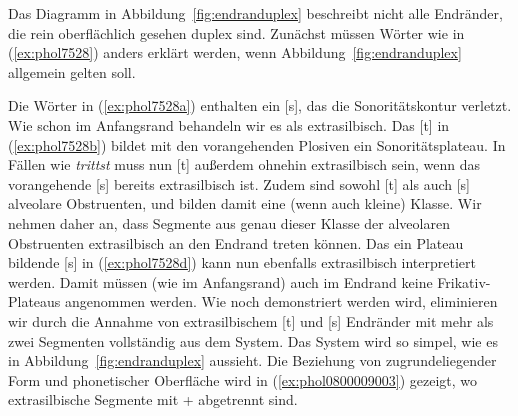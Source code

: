 Das Diagramm in Abbildung~\ref{fig:endranduplex} beschreibt nicht alle Endränder, die rein oberflächlich gesehen duplex sind.
Zunächst müssen Wörter wie in (\ref{ex:phol7528}) anders erklärt werden, wenn Abbildung~\ref{fig:endranduplex} allgemein gelten soll.

\begin{exe}
  \ex \label{ex:phol7528}
  \begin{xlist}
  \end{xlist}
\end{exe}

Die Wörter in (\ref{ex:phol7528a}) enthalten ein [s], das die Sonoritätskontur verletzt.
Wie schon im Anfangsrand behandeln wir es als extrasilbisch.
Das [t] in (\ref{ex:phol7528b}) bildet mit den vorangehenden Plosiven ein Sonoritätsplateau.
In Fällen wie \textit{trittst} muss nun [t] außerdem ohnehin extrasilbisch sein, wenn das vorangehende [s] bereits extrasilbisch ist.
Zudem sind sowohl [t] als auch [s] alveolare Obstruenten, und bilden damit eine (wenn auch kleine) Klasse.
Wir nehmen daher an, dass Segmente aus genau dieser Klasse der alveolaren Obstruenten extrasilbisch an den Endrand treten können.
Das ein Plateau bildende [s] in (\ref{ex:phol7528d}) kann nun ebenfalls extrasilbisch interpretiert werden.
Damit müssen (wie im Anfangsrand) auch im Endrand keine Frikativ-Plateaus angenommen werden.
Wie noch demonstriert werden wird, eliminieren wir durch die Annahme von extrasilbischem [t] und [s] Endränder mit mehr als zwei Segmenten vollständig aus dem System.
Das System wird so simpel, wie es in Abbildung~\ref{fig:endranduplex} aussieht.
Die Beziehung von zugrundeliegender Form und phonetischer Oberfläche wird in (\ref{ex:phol0800009003}) gezeigt, wo extrasilbische Segmente mit + abgetrennt sind.

\begin{exe}
  \ex \label{ex:phol0800009003}
  \begin{xlist}
  \end{xlist}
\end{exe}

